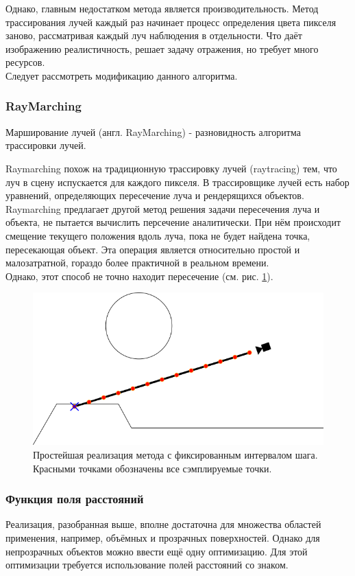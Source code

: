 Однако, главным недостатком метода является производительность. 
Метод трассирования лучей каждый раз начинает процесс определения цвета пикселя заново, 
рассматривая каждый луч наблюдения в отдельности. Что даёт изображению реалистичность, решает задачу отражения, но требует много ресурсов.\\
Следует рассмотреть модификацию данного алгоритма.  
\clearpage

\subsubsection{RayMarching}
Марширование лучей (англ. RayMarching) - разновидность алгоритма трассировки лучей.

Raymarching похож на традиционную трассировку лучей (raytracing) тем, что луч в сцену испускается для каждого пикселя. 
В трассировщике лучей есть набор уравнений, определяющих пересечение луча и рендерящихся объектов. 
Raymarching предлагает другой метод решения задачи пересечения луча и объекта, не пытается вычислить персечение аналитически.
При нём происходит смещение текущего положения вдоль луча, пока не будет найдена точка, пересекающая объект. 
Эта операция является относительно простой и малозатратной, гораздо более практичной в реальном времени.\\
Однако, этот способ не точно находит пересечение (см. рис. \ref{fig:raymarch_2}). 
\begin{figure}
  \centering
  \includegraphics[scale=0.8]{inc/img/raymarch_2}
  \caption{Простейшая реализация метода с фиксированным интервалом шага. Красными точками обозначены все сэмплируемые точки.}
  \label{fig:raymarch_2}
\end{figure}

\subsubsection{Функция поля расстояний} \label{anl:sdf}
Реализация, разобранная выше, вполне достаточна для множества областей применения, например, объёмных и прозрачных поверхностей. 
Однако для непрозрачных объектов можно ввести ещё одну оптимизацию. 
Для этой оптимизации требуется использование полей расстояний со знаком. 

